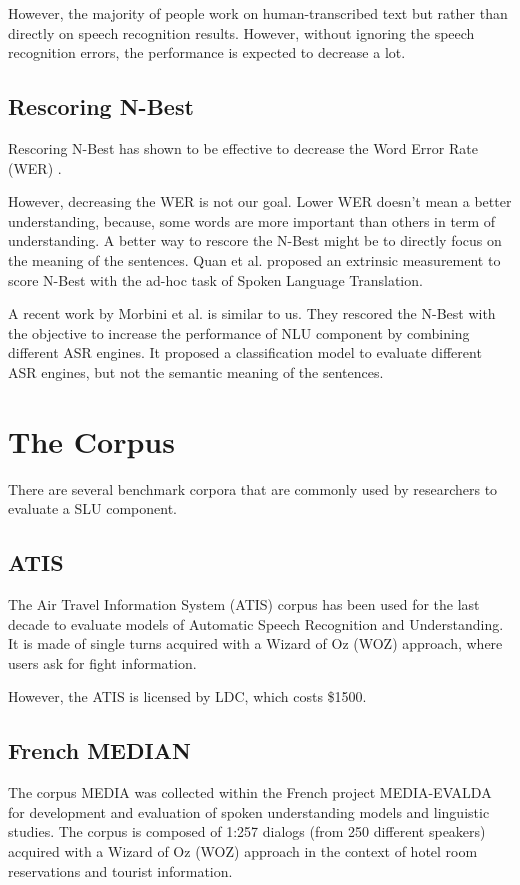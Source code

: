 \documentclass[11pt,letterpaper]{article}
\begin{document}
However, the majority of people work on human-transcribed text but rather than directly on speech recognition results. However, without ignoring the speech recognition errors, the performance is expected to decrease a lot. 

\subsection{Rescoring N-Best}
Rescoring N-Best has shown to be effective to decrease the Word Error Rate (WER) \cite{Zhang:2004,Zhou:2006}.

However, decreasing the WER is not our goal. Lower WER doesn't mean a better understanding, because, some words are more important than others in term of understanding. A better way to rescore the N-Best might be to directly focus on the meaning of the sentences. Quan et al.  proposed an extrinsic measurement to score N-Best with the ad-hoc task of Spoken Language Translation.

A recent work by Morbini et al.  is similar to us. They rescored the N-Best with the objective to increase the performance of NLU component by combining different ASR engines. It proposed a classification model to evaluate different ASR engines, but not the semantic meaning of the sentences.

\section{The Corpus}

There are several benchmark corpora that are commonly used by researchers to evaluate a SLU component.

\subsection{ATIS}
The Air Travel Information System (ATIS) corpus \cite{Dahl:1994} has been used for the last decade to evaluate models of Automatic Speech Recognition and Understanding. It is made of single turns acquired with a Wizard of Oz (WOZ) approach, where users ask for fight information.

However, the ATIS is licensed by LDC, which costs \$1500.

\subsection{French MEDIAN}

The corpus MEDIA was collected within the French project MEDIA-EVALDA \cite{Bonneau-Maynard:2006} for development and evaluation of spoken understanding models and linguistic studies. The corpus is composed of 1:257 dialogs (from 250 different speakers) acquired with a Wizard of Oz (WOZ) approach in the context of hotel room reservations and tourist information.
\end{document}
